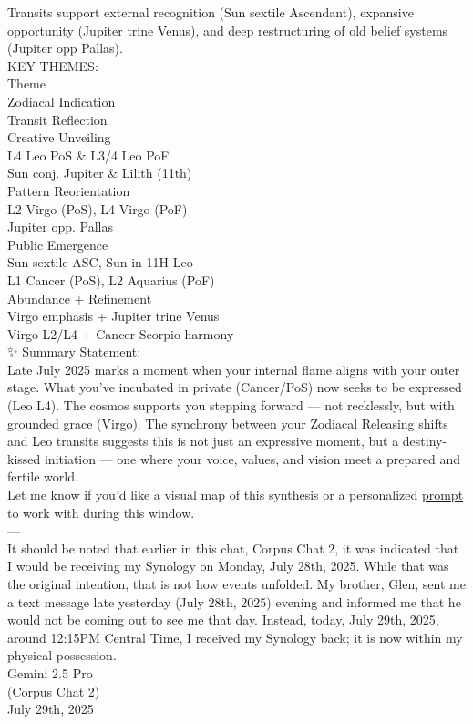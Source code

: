 \documentclass{article}
\begin{document}
Transits support external recognition (Sun sextile Ascendant), expansive opportunity (Jupiter trine Venus), and deep restructuring of old belief systems (Jupiter opp Pallas).\\
KEY THEMES:\\
Theme\\
Zodiacal Indication\\
Transit Reflection\\
Creative Unveiling\\
L4 Leo PoS \& L3/4 Leo PoF\\
Sun conj. Jupiter \& Lilith (11th)\\
Pattern Reorientation\\
L2 Virgo (PoS), L4 Virgo (PoF)\\
Jupiter opp. Pallas\\
Public Emergence\\
Sun sextile ASC, Sun in 11H Leo\\
L1 Cancer (PoS), L2 Aquarius (PoF)\\
Abundance + Refinement\\
Virgo emphasis + Jupiter trine Venus\\
Virgo L2/L4 + Cancer-Scorpio harmony\\
✨ Summary Statement:\\
Late July 2025 marks a moment when your internal flame aligns with your outer stage. What you've incubated in private (Cancer/PoS) now seeks to be expressed (Leo L4). The cosmos supports you stepping forward --- not recklessly, but with grounded grace (Virgo). The synchrony between your Zodiacal Releasing shifts and Leo transits suggests this is not just an expressive moment, but a destiny-kissed initiation --- one where your voice, values, and vision meet a prepared and fertile world.\\
Let me know if you'd like a visual map of this synthesis or a personalized \hyperlink{gloss:prompt}{prompt} to work with during this window.\\
---\\
It should be noted that earlier in this chat, Corpus Chat 2, it was indicated that I would be receiving my Synology on Monday, July 28th, 2025. While that was the original intention, that is not how events unfolded. My brother, Glen, sent me a text message late yesterday (July 28th, 2025) evening and informed me that he would not be coming out to see me that day. Instead, today, July 29th, 2025, around 12:15PM Central Time, I received my Synology back; it is now within my physical possession.\\
Gemini 2.5 Pro\\
(Corpus Chat 2)\\
July 29th, 2025
\end{document}
